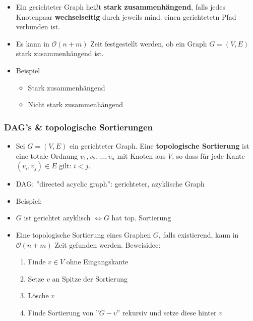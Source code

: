 \documentclass{scrartcl}
\begin{document}
\begin{itemize}
	\item Ein gerichteter Graph heißt \textbf{stark zusammenhängend}, falls jedes Knotenpaar \textbf{wechselseitig} durch jeweils mind. einen gerichtetetn Pfad verbunden ist.
	\item Es kann in $ \mathcal{O}(n+m) $ Zeit festgestellt werden, ob ein Graph $ G = (V,E) $ stark zusammenhängend ist.
	\item Beispiel
	\begin{itemize}
		\item Stark zusammenhängend \\
		
		\item Nicht stark zusammenhängend \\
		
	\end{itemize}
\end{itemize}

\subsubsection{DAG's \& topologische Sortierungen}

\begin{itemize}
	\item Sei $ G = (V,E) $ ein gerichteter Graph. Eine \textbf{topologische Sortierung} ist eine totale Ordnung $ v_1,v_2,\ldots,v_n $ mit Knoten aus $ V $, so dass für jede Kante $ (v_i,v_j) \in E $ gilt: $ i < j $.
	\item DAG: ''directed acyclic graph'': gerichteter, azyklische Graph
	\item Beispiel: \\
	
	\item $ G $ ist gerichtet azyklisch $ \iff G $ hat top. Sortierung
	\item Eine topologische Sortierung eines Graphen $ G $, falls existierend, kann in $ \mathcal{O}(n+m) $ Zeit gefunden werden. Beweisidee:
	\begin{enumerate}
		\item Finde $ v \in V $ ohne Eingangskante
		\item Setze $ v $ an Spitze der Sortierung
		\item Lösche $ v $
		\item Finde Sortierung von ''$ G - v $'' rekursiv und setze diese hinter $ v $
	\end{enumerate}
\end{itemize}
\end{document}
